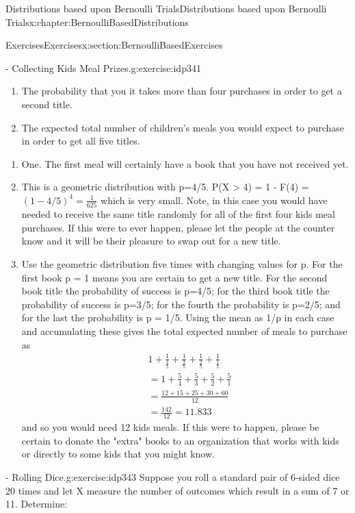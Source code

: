\documentclass[oneside,10pt,]{book}
\numberwithin{equation}{section}
\begin{document}
\begin{chapterptx}{Distributions based upon Bernoulli Trials}{}{Distributions based upon Bernoulli Trials}{}{}{x:chapter:BernoulliBasedDistributions}
\begin{sectionptx}{Exercises}{}{Exercises}{}{}{x:section:BernoulliBasedExercises}
\begin{inlineexercise}{- Collecting Kids Meal Prizes.}{g:exercise:idp341}
\begin{enumerate}
\item{}The probability that you it takes more than four purchases in order to get a second title.%
\item{}The expected total number of children's meals you would expect to purchase in order to get all five titles.%
\end{enumerate}
%
\par\smallskip%
\noindent\hypertarget{g:solution:idp342}{}%
\begin{enumerate}
\item{}One. The first meal will certainly have a book that you have not received yet.%
\item{}This is a geometric distribution with p=4\slash{}5.  P(X \textgreater{} 4) = 1 - F(4) = \((1 - 4/5)^4 = \frac{1}{625}\) which is very small. Note, in this case you would have needed to receive the same title randomly for all of the first four kids meal purchases. If this were to ever happen, please let the people at the counter know and it will be their pleasure to swap out for a new title.%
\item{}Use the geometric distribution five times with changing values for p. For the first book p = 1 means you are certain to get a new title. For the second book title the probability of success is p=4\slash{}5; for the third book title the probability of success is p=3\slash{}5; for the fourth the probability is p=2\slash{}5; and for the last the probability is p = 1\slash{}5. Using the mean as 1\slash{}p in each case and accumulating these gives the total expected number of meals to purchase as%
\begin{align*}
& 1 + \frac{1}{\frac{4}{5}} + \frac{1}{\frac{3}{5}} + \frac{1}{\frac{2}{5}} + \frac{1}{\frac{1}{5}} \\
& = 1 + \frac{5}{4} + \frac{5}{3} + \frac{5}{2} + \frac{5}{1} \\
& = \frac{12 + 15 + 25 + 30 + 60}{12} \\
& = \frac{142}{12} = 11.833
\end{align*}
and so you would need 12 kids meals.  If this were to happen, please be certain to donate the "extra" books to an organization that works with kids or directly to some kids that you might know.%
\end{enumerate}
%
\end{inlineexercise}%
\begin{inlineexercise}{- Rolling Dice.}{g:exercise:idp343}%
Suppose you roll a standard pair of 6-sided dice 20 times and let X measure the number of outcomes which result in a sum of 7 or 11. Determine:%

\end{inlineexercise}
\end{sectionptx}
\end{chapterptx}
\end{document}
